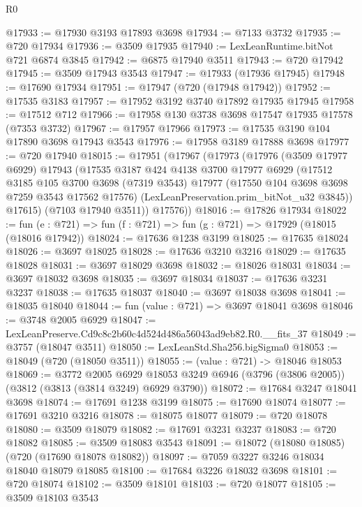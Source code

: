 \begin{lexlean}{R0}
\begin{coremodule}
@17933 := @17930 @3193 @17893 @3698
@17934 := @7133 @3732
@17935 := @720 @17934
@17936 := @3509 @17935
@17940 := LexLeanRuntime.bitNot @721 @6874 @3845
@17942 := @6875 @17940 @3511
@17943 := @720 @17942
@17945 := @3509 @17943 @3543
@17947 := @17933 (@17936 @17945)
@17948 := @17690 @17934
@17951 := @17947 (@720 (@17948 @17942))
@17952 := @17535 @3183
@17957 := @17952 @3192 @3740 @17892 @17935 @17945
@17958 := @17512 @712
@17966 := @17958 @130 @3738 @3698 @17547 @17935 @17578 (@7353 @3732)
@17967 := @17957 @17966
@17973 := @17535 @3190 @104 @17890 @3698 @17943 @3543
@17976 := @17958 @3189 @17888 @3698
@17977 := @720 @17940
@18015 := @17951
    (@17967
      (@17973
        (@17976
          (@3509 @17977 @6929)
          @17943
          (@17535
            @3187
            @424
            @4138
            @3700
            @17977
            @6929
            (@17512
              @3185
              @105
              @3700
              @3698
              (@7319 @3543)
              @17977
              (@17550 @104 @3698 @3698 @7259 @3543 @17562 @17576)
              (LexLeanPreservation.prim_bitNot_u32 @3845))
            @17615)
          (@7103 @17940 @3511))
        @17576))
@18016 := @17826 @17934
@18022 := fun (e : @721) => fun (f : @721) => fun (g : @721) => @17929 (@18015 (@18016 @17942))
@18024 := @17636 @1238 @3199
@18025 := @17635 @18024
@18026 := @3697 @18025
@18028 := @17636 @3210 @3216
@18029 := @17635 @18028
@18031 := @3697 @18029 @3698
@18032 := @18026 @18031
@18034 := @3697 @18032 @3698
@18035 := @3697 @18034
@18037 := @17636 @3231 @3237
@18038 := @17635 @18037
@18040 := @3697 @18038 @3698
@18041 := @18035 @18040
@18044 := fun (value : @721) => @3697 @18041 @3698
@18046 := @3748 @2005 @6929
@18047 := LexLeanPreserve.Cd9c8c2b60c4d524d486a56043ad9eb82.R0.__fits_37
@18049 := @3757 (@18047 @3511)
@18050 := LexLeanStd.Sha256.bigSigma0
@18053 := @18049 (@720 (@18050 @3511))
@18055 := (value : @721) -> @18046 @18053
@18069 := @3772
    @2005
    @6929
    @18053
    @3249
    @6946
    (@3796 (@3806 @2005))
    (@3812 (@3813 (@3814 @3249) @6929 @3790))
@18072 := @17684 @3247 @18041 @3698
@18074 := @17691 @1238 @3199
@18075 := @17690 @18074
@18077 := @17691 @3210 @3216
@18078 := @18075 @18077
@18079 := @720 @18078
@18080 := @3509 @18079
@18082 := @17691 @3231 @3237
@18083 := @720 @18082
@18085 := @3509 @18083 @3543
@18091 := @18072 (@18080 @18085) (@720 (@17690 @18078 @18082))
@18097 := @7059 @3227 @3246 @18034 @18040 @18079 @18085
@18100 := @17684 @3226 @18032 @3698
@18101 := @720 @18074
@18102 := @3509 @18101
@18103 := @720 @18077
@18105 := @3509 @18103 @3543

\end{coremodule}
\end{lexlean}
